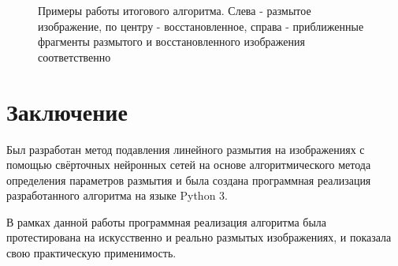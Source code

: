 \begin{figure}[H]
\caption{Примеры работы итогового алгоритма. Слева - размытое изображение, по центру - восстановленное, справа - приближенные фрагменты размытого и восстановленного изображения соответственно}
\label{ris:res_ex}
\end{figure}

\newpage
\section{Заключение}
Был разработан метод подавления линейного размытия на изображениях с помощью свёрточных нейронных сетей на основе алгоритмического метода определения параметров размытия и была создана программная реализация разработанного алгоритма на языке Python 3.

В рамках данной работы программная реализация алгоритма была протестирована
на искусственно и реально размытых изображениях, и показала свою практическую применимость.


\newpage
\printbibliography[heading=bibintoc]

